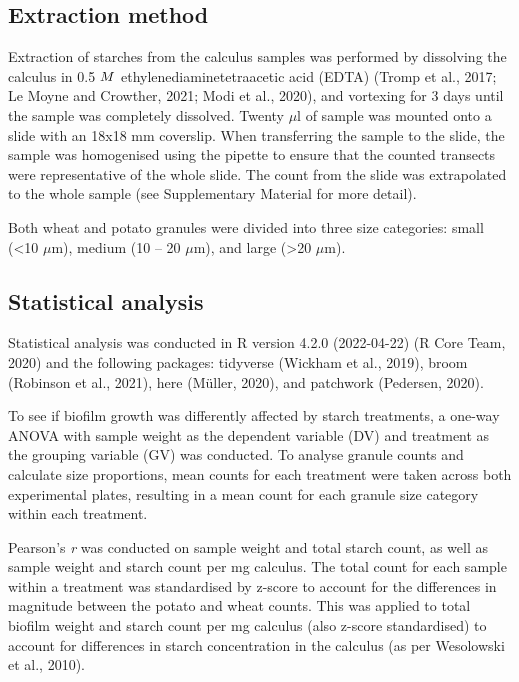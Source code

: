 \documentclass[utf8]{frontiers/frontiersSCNS}
\begin{document}
\hypertarget{extraction-method}{%
\subsection{Extraction method}\label{extraction-method}}

Extraction of starches from the calculus samples was performed by dissolving the
calculus in 0.5 \(\tiny{M}\) ethylenediaminetetraacetic acid (EDTA)
(Tromp et al., 2017; Le Moyne and Crowther, 2021; Modi et al., 2020),
and vortexing for 3 days until the sample was completely dissolved.
Twenty \(\mu\)l of sample was mounted onto a slide with an 18x18 mm coverslip.
When transferring the sample to the slide, the sample was homogenised using
the pipette to ensure that the counted transects were representative of the
whole slide. The count from the slide was extrapolated to the whole sample
(see Supplementary Material for more detail).

Both wheat and potato granules were divided into three size categories:
small (\textless10 \(\mu\)m), medium (10 -- 20 \(\mu\)m), and large (\textgreater20 \(\mu\)m).

\hypertarget{statistical-analysis}{%
\subsection{Statistical analysis}\label{statistical-analysis}}

Statistical analysis was conducted in R version 4.2.0 (2022-04-22) (R Core Team, 2020) and
the following packages: tidyverse (Wickham et al., 2019), broom (Robinson et al., 2021),
here (Müller, 2020), and patchwork (Pedersen, 2020).

To see if biofilm growth was differently affected by starch treatments, a
one-way ANOVA with sample weight as the dependent variable (DV) and treatment
as the grouping variable (GV) was conducted.
To analyse granule counts and calculate size proportions, mean counts for each
treatment were taken across
both experimental plates, resulting in a mean count for each
granule size category within each treatment.

Pearson's \emph{r} was conducted on sample weight and total starch count, as well as sample
weight and starch count per mg calculus. The total count for each sample within a
treatment was standardised by z-score to account for the differences in magnitude
between the potato and wheat counts.
This was applied to total biofilm weight and starch count per mg
calculus (also z-score standardised) to account for differences in starch
concentration in the calculus (as per Wesolowski et al., 2010).
\end{document}
